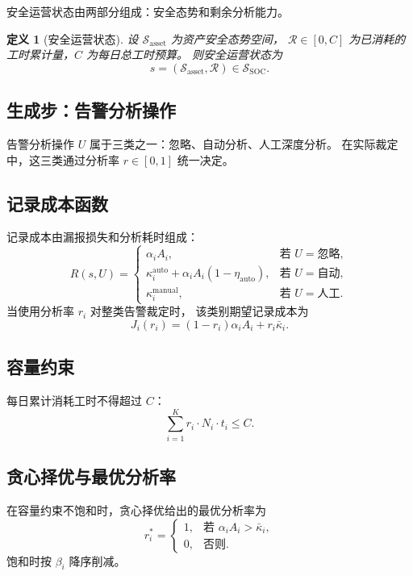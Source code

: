 \documentclass[11pt,a4paper]{article}
\newtheorem{definition}{定义}[section]
\begin{document}
安全运营状态由两部分组成：安全态势和剩余分析能力。

\begin{definition}[安全运营状态]
设 $\mathcal{S}_{\text{asset}}$ 为资产安全态势空间，
$\mathcal{R} \in [0, C]$ 为已消耗的工时累计量，$C$ 为每日总工时预算。
则安全运营状态为
\[
s = (\mathcal{S}_{\text{asset}}, \mathcal{R}) \in \mathcal{S}_{\text{SOC}}.
\]
\end{definition}

\subsection{生成步：告警分析操作}

告警分析操作 $U$ 属于三类之一：忽略、自动分析、人工深度分析。
在实际裁定中，这三类通过分析率 $r \in [0,1]$ 统一决定。

\subsection{记录成本函数}

记录成本由漏报损失和分析耗时组成：
\[
R(s, U) = 
\begin{cases}
\alpha_i A_i, & \text{若 } U = \text{忽略}, \\[4pt]
\kappa_i^{\text{auto}} + \alpha_i A_i (1 - \eta_{\text{auto}}), & \text{若 } U = \text{自动}, \\[4pt]
\kappa_i^{\text{manual}}, & \text{若 } U = \text{人工}.
\end{cases}
\]
当使用分析率 $r_i$ 对整类告警裁定时，
该类别期望记录成本为
\[
J_i(r_i) = (1 - r_i) \alpha_i A_i + r_i \bar{\kappa}_i.
\]

\subsection{容量约束}

每日累计消耗工时不得超过 $C$：
\[
\sum_{i=1}^{K} r_i \cdot N_i \cdot t_i \le C.
\]

\subsection{贪心择优与最优分析率}

在容量约束不饱和时，贪心择优给出的最优分析率为
\[
r_i^* = 
\begin{cases}
1, & \text{若 } \alpha_i A_i > \bar{\kappa}_i, \\[4pt]
0, & \text{否则}.
\end{cases}
\]
饱和时按 $\beta_i$ 降序削减。
\end{document}
